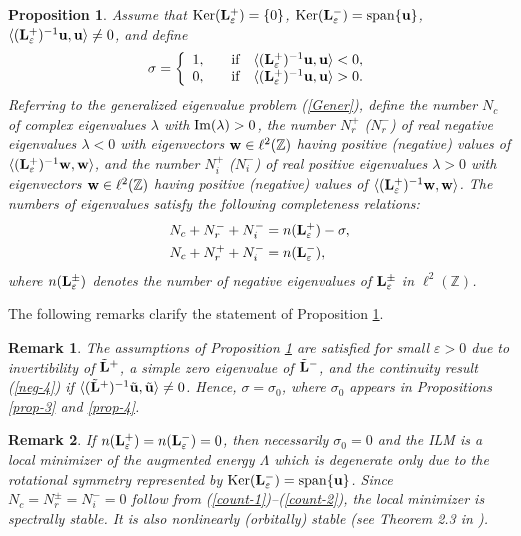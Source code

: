 \documentclass[12pt,reqno]{amsart}
\newtheorem{remark}{Remark}
\newtheorem{prop}{Proposition}
\begin{document}
\begin{prop}
	\label{theorem-count}
	Assume that ${\rm Ker}({\bf L}^+_{\varepsilon}) = \{ 0 \}$, 
	${\rm Ker}({\bf L}^-_{\varepsilon}) = {\rm span}\{{\bf u}\}$, 
$\langle ({\bf L}_{\varepsilon}^+)^{-1} {\bf u}, {\bf u} \rangle \neq 0$, and define 
$$
\sigma = \left\{ \begin{array}{ll} 1, \quad & \mbox{\rm if} \quad \langle ({\bf L}_{\varepsilon}^+)^{-1} {\bf u}, {\bf u} \rangle  < 0, \\
0, \quad & \mbox{\rm if} \quad  \langle ({\bf L}_{\varepsilon}^+)^{-1} {\bf u}, {\bf u} \rangle  > 0. \end{array} \right.
$$ 
Referring to the generalized eigenvalue problem (\ref{Gener}), define the number $N_c$ of complex eigenvalues $\lambda$  with ${\rm Im}(\lambda) > 0$, the number $N_r^{+}$ ($N_r^-$) of real negative eigenvalues $\lambda < 0$ with eigenvectors ${\bf w} \in \ell^2(\mathbb{Z})$ having positive (negative) values of $\langle ({\bf L}_{\varepsilon}^+)^{-1} {\bf w}, {\bf w} \rangle$, and the number $N_i^{+}$ ($N_i^-$) of real positive eigenvalues $\lambda > 0$ with eigenvectors ${\bf w} \in \ell^2(\mathbb{Z})$ having positive (negative) values of $\langle ({\bf L}_{\varepsilon}^+)^{-1} {\bf w}, {\bf w} \rangle$. 
The numbers of eigenvalues satisfy the following completeness relations:
	\begin{align}
	\label{count-1}
	N_c + N_r^- + N_i^- &= n({\bf L}_{\varepsilon}^+) - \sigma, \\
	\label{count-2}
	N_c + N_r^+ + N_i^- &= n({\bf L}_{\varepsilon}^-),
	\end{align}
where $n({\bf L}_{\varepsilon}^{\pm})$ denotes the number of negative eigenvalues of ${\bf L}_{\varepsilon}^{\pm}$ in $\ell^2(\mathbb{Z})$.
\end{prop}

The following remarks clarify the statement of Proposition \ref{theorem-count}. 

\begin{remark}
	The assumptions of Proposition \ref{theorem-count} are satisfied 
	for small $\varepsilon > 0$ due to invertibility of $\tilde{\bf L}^+$, 
	a simple zero eigenvalue of $\tilde{\bf L}^-$, and the continuity result (\ref{neg-4}) if $\langle (\tilde{\bf L}^+)^{-1} \tilde{\bf u}, \tilde{\bf u} \rangle \neq 0$. Hence, $\sigma = \sigma_0$, where $\sigma_0$ appears in Propositions \ref{prop-3} and \ref{prop-4}.
\end{remark}

\begin{remark}
	If $n({\bf L}_{\varepsilon}^+) = n({\bf L}_{\varepsilon}^-) = 0$, 
	then necessarily $\sigma_0 = 0$ and the ILM is a local minimizer of the augmented energy $\Lambda$ which is degenerate only due to the rotational symmetry represented by ${\rm Ker}({\bf L}^-_{\varepsilon}) = {\rm span}\{{\bf u}\}$. Since $N_c = N_r^{\pm} = N_i^- = 0$ follow from (\ref{count-1})--(\ref{count-2}), the local minimizer is spectrally stable. It is also nonlinearly (orbitally) stable (see Theorem 2.3 in \cite{GP25}).
\end{remark}
\end{document}
